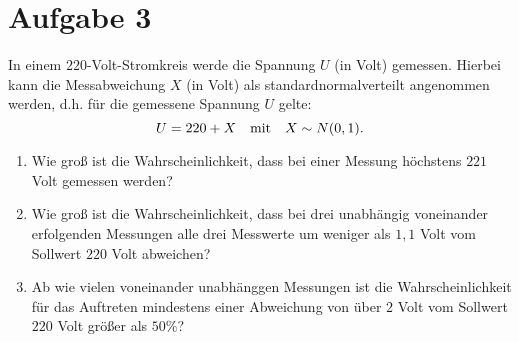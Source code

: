 \documentclass{exercise}
\begin{document}
    \section*{Aufgabe 3}
    
    \begin{problem}
        In einem \(220\)-Volt-Stromkreis werde die Spannung \(U\) (in Volt) gemessen.
        Hierbei kann die Messabweichung \(X\) (in Volt) als standardnormalverteilt angenommen werden, d.h. für die gemessene Spannung \(U\) gelte:
        \[
            U = 220 + X \quad \text{mit} \quad X \sim N\parentheses*{0, 1}.
        \]
        \begin{enumerate}
            \item Wie groß ist die Wahrscheinlichkeit, dass bei einer Messung höchstens \(221\) Volt gemessen werden?
            \item Wie groß ist die Wahrscheinlichkeit, dass bei drei unabhängig voneinander erfolgenden Messungen alle drei Messwerte um weniger als \(1,1\) Volt vom Sollwert \(220\) Volt abweichen?
            \item Ab wie vielen voneinander unabhänggen Messungen ist die Wahrscheinlichkeit für das Auftreten mindestens einer Abweichung von über \(2\) Volt vom Sollwert \(220\) Volt größer als \(50\%\)?
        \end{enumerate}
    \end{problem}
    
\end{document}
